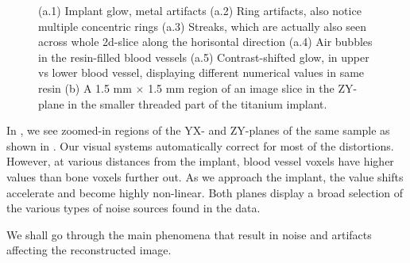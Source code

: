 \begin{figure}
{    %
    (a.1) Implant glow, metal artifacts
    (a.2) Ring artifacts, also notice multiple concentric rings
    (a.3) Streaks, which are actually also seen across whole 2d-slice along the horisontal direction
    (a.4) Air bubbles in the resin-filled blood vessels
    (a.5) Contrast-shifted glow, in upper vs lower blood vessel, displaying different numerical values in same resin
    (b) A 1.5 mm $\times$ 1.5 mm region of an image slice in the ZY-plane in the
    smaller threaded part of the titanium implant.
  }
\label{fig:slices}
\end{figure}

In , we see zoomed-in regions of the YX- and ZY-planes of the
same sample as shown in .  Our visual systems
automatically correct for most of the distortions. However, at various
distances from the implant, blood vessel voxels have higher values than bone
voxels further out. As we approach the implant, the value shifts accelerate and
become highly non-linear.  Both planes display a broad selection of the various
types of noise sources found in the data.

We shall go through the main phenomena that result in noise and artifacts
affecting the reconstructed image.

